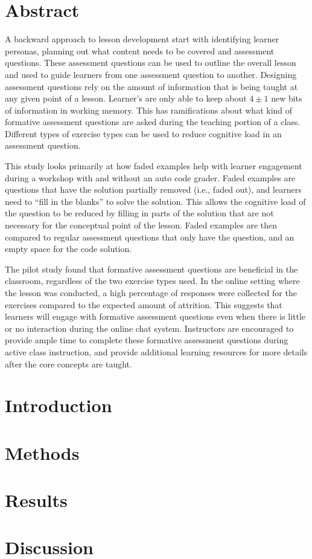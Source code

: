 \documentclass[../main.tex]{subfiles}
\begin{document}
\section*{Abstract}

A backward approach to lesson development start with identifying learner personas,
planning out what content needs to be covered and assessment questions.
These assessment questions can be used to outline the overall lesson
and used to guide learners from one assessment question to another.
Designing assessment questions rely on the amount of information that is being taught
at any given point of a lesson.
Learner's are only able to keep about $4\pm1$ new bits of information in working memory.
This has ramifications about what kind of formative assessment questions
are asked during the teaching portion of a class.
Different types of exercise types can be used
to reduce cognitive load in an assessment question.

This study looks primarily at how faded examples help with learner engagement during a workshop
with and without an auto code grader.
Faded examples are questions that have the solution partially removed (i.e., faded out),
and learners need to ``fill in the blanks'' to solve the solution.
This allows the cognitive load of the question to be reduced by filling in parts of the
solution that are not necessary for the conceptual point of the lesson.
Faded examples are then compared to regular assessment questions that only have the question,
and an empty space for the code solution.

The pilot study found that formative assessment questions are beneficial in the classroom,
regardless of the two exercise types used.
In the online setting where the lesson was conducted,
a high percentage of responses were collected for the exercises compared to the expected amount of attrition.
This suggests that learners will engage with formative assessment questions even when
there is little or no interaction during the online chat system.
Instructors are encouraged to provide ample time to complete these formative assessment questions
during active class instruction,
and provide additional learning resources for more details after the core concepts are taught.

\section{Introduction}

    

\section{Methods}

    

\section{Results}

    

\section{Discussion}

    
\end{document}
